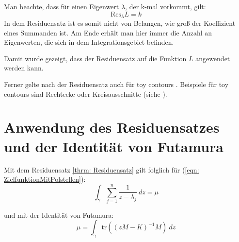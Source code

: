 \documentclass[a4paper,12pt]{report}
\newcommand{\zitat}[1]{\glqq #1 \grqq}
\newcommand{\tr}{\text{tr}}
\newcommand{\inv}{^{-1}}
\newcommand{\1}{\mathds{1}}
\newcommand{\Res}{\text{Res}}
\theoremstyle{plain} %
\theoremstyle{definition} %
\theoremstyle{remark}
\begin{document}
\begin{itemize}
                        Man beachte, dass für einen Eigenwert $\lambda$, der k-mal vorkommt, gilt:
                        $$\Res_\lambda L = k$$
                        In dem Residuensatz ist es somit nicht von Belangen, wie groß der Koeffizient eines Summanden ist. Am Ende erhält man hier immer die Anzahl an Eigenwerten, die sich in dem Integrationsgebiet befinden.
            \end{itemize}

            Damit wurde gezeigt, dass der Residuensatz auf die Funktion $L$ angewendet werden kann.

            Ferner gelte nach \cite[S. 77]{complexAnalysisVL} der Residuensatz auch für \zitat{toy contours}\cite[S. 77]{complexAnalysisVL}.
            Beispiele für toy contours sind Rechtecke oder Kreisausschnitte (siehe \cite[S. 42]{complexAnalysisVL}).

      \section{Anwendung des Residuensatzes und der Identität von Futamura}

            Mit dem Residuensatz \ref{thrm: Residuensatz} gilt folglich für (\ref{eqn: ZielfunktionMitPolstellen}):
            $$\int_\gamma \sum_{j=1}^{n} \frac{1}{z-\lambda_j}\ dz = \mu$$

            und mit der Identität von Futamura:
            $$\mu = \int_\gamma \tr((zM-K)\inv M)\ dz$$
\end{document}

